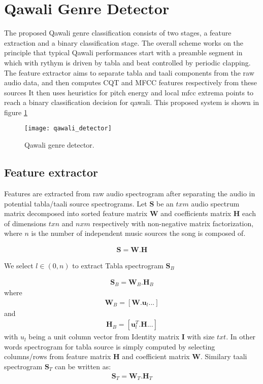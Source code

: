 \documentclass{article}
\begin{document}
\section{Qawali Genre Detector}\label{sec:detector}

The proposed Qawali genre classification consists of two stages, a feature extraction and a binary classification stage. The overall scheme works on the principle that typical Qawali performances start with a preamble segment in which with rythym is driven by tabla and beat controlled by periodic clapping. The feature extractor aims to separate tabla and taali components from the raw audio data, and then computes CQT and MFCC features respectively from these sources It then uses heuristics for pitch energy and local mfcc extrema points to reach a binary classification decision for qawali. This proposed system is shown in figure \ref{fig:figure}
\begin{figure}[htbp]
  \centering
  \texttt{[image: qawali\_detector]}
  \caption{Qawali genre detector.}
\label{fig:figure}
\end{figure}

\subsection{Feature extractor}
Features are extracted from raw audio spectrogram after separating the audio in potential tabla/taali source spectrograms. Let $\boldsymbol{S}$ be an $txm$ audio spectrum matrix decomposed into sorted feature matrix $\boldsymbol{W}$ and coefficients matrix $\boldsymbol{H}$ each of dimensions $txn$ and $nxm$ respectively with non-negative matrix factorization, where $n$ is the number of independent music sources the song is composed of.

\begin{align}\label{eq:eq1}
\boldsymbol{S} = \boldsymbol{W}.\boldsymbol{H}
\end{align}

We select $l \in (0,n)$ to extract Tabla spectrogram $\boldsymbol{S}_{B}$ 

\begin{align}\label{eq:eq2}
\boldsymbol{S}_{B} = \boldsymbol{W}_{B}.\boldsymbol{H}_{B}
\end{align}
where
\begin{align}\label{eq:eq3}
\boldsymbol{W}_{B} = [\boldsymbol{W}.\boldsymbol{u}_{l} ...]
\end{align}
and 
\begin{align}\label{eq:eq4}
\boldsymbol{H}_{B} = [\boldsymbol{u}_{l}^T.\boldsymbol{H} ...]
\end{align}
with $u_{l}$ being a unit column vector from Identity matrix $\boldsymbol{I}$ with size $txt$. In other words spectrogram for tabla source is simply computed
by selecting columns/rows from feature matrix $\boldsymbol{H}$ and coefficient matrix $\boldsymbol{W}$. Similary taali spectrogram $\boldsymbol{S}_{T}$ can be written as:
\begin{align}\label{eq:eq5}
\boldsymbol{S}_{T} = \boldsymbol{W}_{T}.\boldsymbol{H}_{T}
\end{align}
\end{document}
